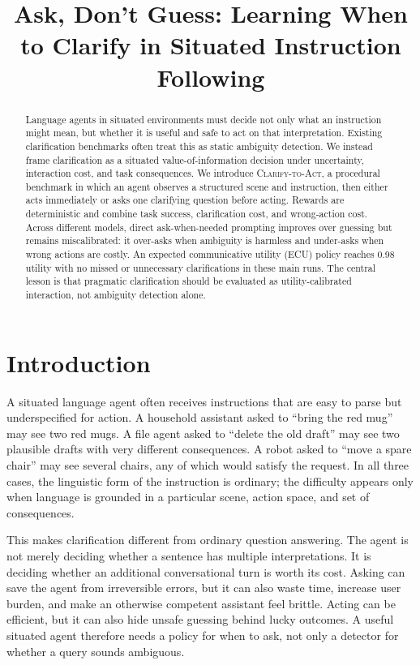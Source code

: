 \documentclass{article} %
\title{Ask, Don't Guess: Learning When to Clarify in Situated Instruction Following}
\newcommand{\task}{\textsc{Clarify-to-Act}}
\newcommand{\ecu}{\textsc{ECU}}
\begin{document}
\ifcolmsubmission
\linenumbers
\fi
\maketitle

\begin{abstract}
Language agents in situated environments must decide not only what an instruction might mean, but whether it is useful and safe to act on that interpretation. Existing clarification benchmarks often treat this as static ambiguity detection. We instead frame clarification as a situated value-of-information decision under uncertainty, interaction cost, and task consequences. We introduce \task, a procedural benchmark in which an agent observes a structured scene and instruction, then either acts immediately or asks one clarifying question before acting. Rewards are deterministic and combine task success, clarification cost, and wrong-action cost. Across different models, direct ask-when-needed prompting improves over guessing but remains miscalibrated: it over-asks when ambiguity is harmless and under-asks when wrong actions are costly. An expected communicative utility (\ecu) policy reaches 0.98 utility with no missed or unnecessary clarifications in these main runs. The central lesson is that pragmatic clarification should be evaluated as utility-calibrated interaction, not ambiguity detection alone.
\end{abstract}

\section{Introduction}

A situated language agent often receives instructions that are easy to parse but underspecified for action. A household assistant asked to ``bring the red mug'' may see two red mugs. A file agent asked to ``delete the old draft'' may see two plausible drafts with very different consequences. A robot asked to ``move a spare chair'' may see several chairs, any of which would satisfy the request. In all three cases, the linguistic form of the instruction is ordinary; the difficulty appears only when language is grounded in a particular scene, action space, and set of consequences.

This makes clarification different from ordinary question answering. The agent is not merely deciding whether a sentence has multiple interpretations. It is deciding whether an additional conversational turn is worth its cost. Asking can save the agent from irreversible errors, but it can also waste time, increase user burden, and make an otherwise competent assistant feel brittle. Acting can be efficient, but it can also hide unsafe guessing behind lucky outcomes. A useful situated agent therefore needs a policy for when to ask, not only a detector for whether a query sounds ambiguous.
\end{document}
